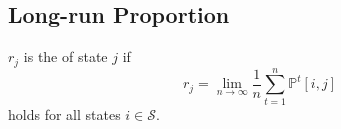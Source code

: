 \subsection{Long-run Proportion}

\begin{definition}
$ r_{j} $ is the  of state $ j $ if
\[ r_{j} = \lim_{n \to \infty} \frac{1}{n} \sum_{t = 1}^{n} \mathbb{P}^{t}[i, j] \]
holds for all states $ i \in \mathcal{S} $.

\begin{comment}
Why this name?

Support $ N $ is a uniform distribution over $ \{ 1, \cdots, n \} $. The ``long-run proportion of state $ j $'' is
\begin{eqnarray*}
  &   & \lim_{n \to \infty} P(X(N) = j \mid X(0) = i) \\
  & = & \lim_{n \to \infty} P(X(N) = j \mid N = t, X(0) = i) \cdot P(N = t \mid X(0) = i) \\
  & = & \lim_{n \to \infty} P(X(N) = j \mid X(0) = i) \cdot \frac{1}{n} \\
  & = & \lim_{n \to \infty} \frac{1}{n} \sum_{t = 1}^{n} \mathbb{P}^{t}[i, j]
\end{eqnarray*}

(Proportion：state 在 t 時間內出現的比例有多高。)
\end{comment}
\end{definition}

